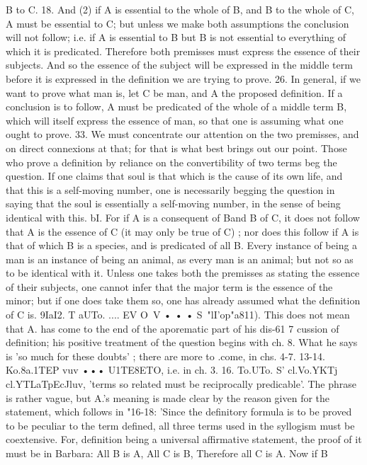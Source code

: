 {{{{{{{{{{{{{{{{{{{{{{{{B to C.
18. And (2) if A is essential to the whole of B, and B to the
whole of C, A must be essential to C; but unless we make both
assumptions the conclusion will not follow; i.e. if A is essential
to B but B is not essential to everything of which it is predicated.
Therefore both premisses must express the essence of their subjects.
And so the essence of the subject will be expressed in the middle
term before it is expressed in the definition we are trying to prove.
26. In general, if we want to prove what man is, let C be man,
and A the proposed definition. If a conclusion is to follow, A
must be predicated of the whole of a middle term B, which will
itself express the essence of man, so that one is assuming what
one ought to prove.
33. We must concentrate our attention on the two premisses,
and on direct connexions at that; for that is what best brings out
our point. Those who prove a definition by reliance on the
convertibility of two terms beg the question. If one claims that
soul is that which is the cause of its own life, and that this is a
self-moving number, one is necessarily begging the question in
saying that the soul is essentially a self-moving number, in the
sense of being identical with this.
bI. For if A is a consequent of Band B of C, it does not follow
that A is the essence of C (it may only be true of C) ; nor does this
follow if A is that of which B is a species, and is predicated of
all B. Every instance of being a man is an instance of being an
animal, as every man is an animal; but not so as to be identical
with it. Unless one takes both the premisses as stating the
essence of their subjects, one cannot infer that the major term is
the essence of the minor; but if one does take them so, one has
already assumed what the definition of C is.
9IaI2. T aUTo. .... EV O~V • • • S~"lI'op"a811). This does not mean
that A. has come to the end of the aporematic part of his dis-61 7
cussion of definition; his positive treatment of the question begins
with ch. 8. What he says is 'so much for these doubts' ; there are
more to .come, in chs. 4-7.
13-14. Ko.8a.1TEP vuv ••• U1TE8ETO, i.e. in ch. 3.
16. To.UTo. S' cl.Vo.YKTj cl.YTLaTpEcJluv, 'terms so related must be
reciprocally predicable'. The phrase is rather vague, but A.'s
meaning is made clear by the reason given for the statement,
which follows in "16-18: 'Since the definitory formula is to be
proved to be peculiar to the term defined, all three terms used
in the syllogism must be coextensive. For, definition being a
universal affirmative statement, the proof of it must be in
Barbara: All B is A, All C is B, Therefore all C is A. Now if B
}}}}}}}}}}}}}}}}}}}}}}}}

